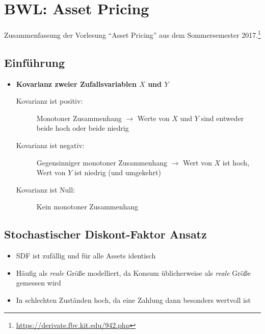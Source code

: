 \chapter{BWL: Asset Pricing}

Zusammenfassung der Vorlesung "`Asset Pricing"' aus dem Sommersemester 2017.\footnote{\url{https://derivate.fbv.kit.edu/942.php}}



\section{Einführung}
\begin{itemize}
	\item \textbf{Kovarianz zweier Zufallsvariablen \(X\) und \(Y\)}
	\begin{description}
		\item[Kovarianz ist positiv:] Monotoner Zusammenhang \(\rightarrow\) Werte von \(X\) und \(Y\) sind entweder beide hoch oder beide niedrig
		\item[Kovarianz ist negativ:] Gegensinniger monotoner Zusammenhang \(\rightarrow\) Wert von \(X\) ist hoch, Wert von \(Y\) ist niedrig (und umgekehrt)
		\item[Kovarianz ist Null:] Kein monotoner Zusammenhang
	\end{description}
\end{itemize}



\section{Stochastischer Diskont-Faktor Ansatz}
\begin{itemize}
	\item SDF ist zufällig und für alle Assets identisch
	\item Häufig als \textit{reale} Größe modelliert, da Konsum üblicherweise als \textit{reale} Größe gemessen wird
	\item In schlechten Zuständen hoch, da eine Zahlung dann besonders wertvoll ist
\end{itemize}

